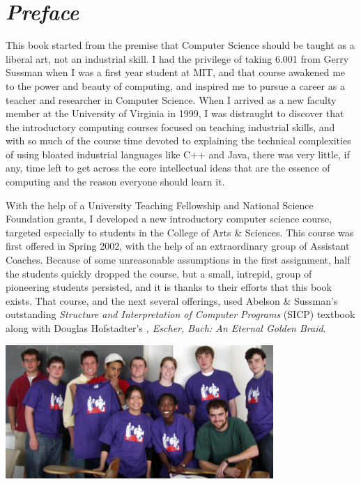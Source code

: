 \chapter*{\vspace*{2ex}\emph{Preface}}
\slatexignorecurrentfile

This book started from the premise that Computer Science should be taught as a liberal art, not an industrial skill.  I had the privilege of taking 6.001 from Gerry Sussman when I was a first year student at MIT, and that course awakened me to the power and beauty of computing, and inspired me to pursue a career as a teacher and researcher in Computer Science.  When I arrived as a new faculty member at the University of Virginia in 1999, I was distraught to discover that the introductory computing courses focused on teaching industrial skills, and with so much of the course time devoted to explaining the technical complexities of using bloated industrial languages like C++ and Java, there was very little, if any, time left to get across the core intellectual ideas that are the essence of computing and the reason everyone should learn it.  

With the help of a University Teaching Fellowship and National Science Foundation grants, I developed a new introductory computer science course, targeted especially to students in the College of Arts \& Sciences.  This course was first offered in Spring 2002, with the help of an extraordinary group of Assistant Coaches.  Because of some unreasonable assumptions in the first assignment, half the students quickly dropped the course, but a small, intrepid, group of pioneering students persisted, and it is thanks to their efforts that this book exists.  That course, and the next several offerings, used Abelson \& Sussman's outstanding \emph{Structure and Interpretation of Computer Programs} (SICP) textbook along with Douglas Hofstadter's \emph{\Godel, Escher, Bach: An Eternal Golden Braid}.  

{\centering
\includegraphics[width=4.0in]{images/cs200-2002-edited.jpg}
\\
}

